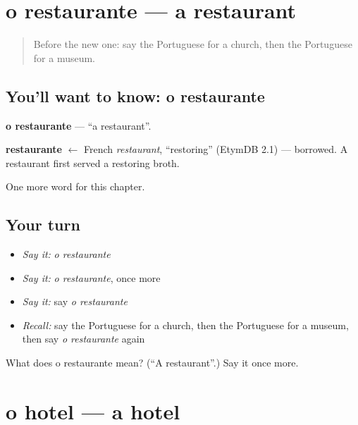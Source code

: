 \section[o restaurante]{o restaurante — a restaurant}

\label{lesson:PT-C75-restaurante}



\begin{quote}
Before the new one: say the Portuguese for a church, then the Portuguese for a museum.
\end{quote}

\subsection*{You'll want to know: o restaurante}
\textbf{o restaurante} — \textquotedblleft{}a restaurant\textquotedblright{}.

\begin{cousinweb}
\textbf{restaurante} $\leftarrow$ French \emph{restaurant}, \textquotedblleft{}restoring\textquotedblright{} (EtymDB 2.1) — borrowed. A restaurant first served a restoring broth.
\end{cousinweb}

\begin{grammarlens}[title={What you've built}]
One more word for this chapter.
\end{grammarlens}

\subsection*{Your turn}
\begin{itemize}
\raggedright
  \item \emph{Say it:} \emph{o restaurante}
  \item \emph{Say it:} \emph{o restaurante}, once more
  \item \emph{Say it:} say \emph{o restaurante}
  \item \emph{Recall:} say the Portuguese for a church, then the Portuguese for a museum, then say \emph{o restaurante} again
\end{itemize}

\begin{tcolorbox}[breakable,colback=teal!4,colframe=teal!35!black,title={Before you move on}]
What does o restaurante mean? (\textquotedblleft{}A restaurant\textquotedblright{}.) Say it once more.
\end{tcolorbox}
\section[o hotel]{o hotel — a hotel}

